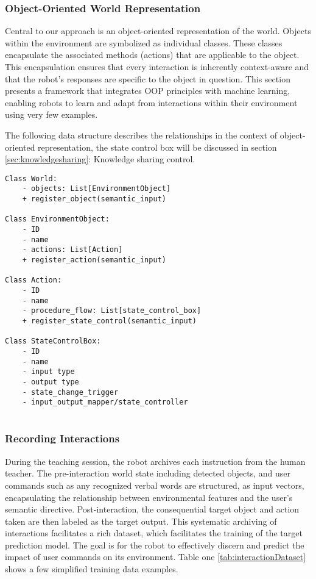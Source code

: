 \documentclass[conference]{IEEEtran}
\begin{document}
\subsubsection{Object-Oriented World Representation}

Central to our approach is an object-oriented representation of the world. Objects within the environment are symbolized as individual classes. These classes encapsulate the associated methods (actions) that are applicable to the object. This encapsulation ensures that every interaction is inherently context-aware and that the robot's responses are specific to the object in question. This section presents a framework that integrates OOP principles with machine learning, enabling robots to learn and adapt from interactions within their environment using very few examples.

The following data structure describes the relationships in the context of object-oriented representation, the state control box will be discussed in section \ref{sec:knowledgesharing}: Knowledge sharing control.

\begin{small}
\begin{verbatim}
Class World:
    - objects: List[EnvironmentObject]
    + register_object(semantic_input)

Class EnvironmentObject:
    - ID
    - name
    - actions: List[Action]
    + register_action(semantic_input)

Class Action:
    - ID
    - name
    - procedure_flow: List[state_control_box]
    + register_state_control(semantic_input)

Class StateControlBox:
    - ID
    - name
    - input type
    - output type
    - state_change_trigger
    - input_output_mapper/state_controller
    
\end{verbatim}
\end{small}

\subsubsection{Recording Interactions}

During the teaching session, the robot archives each instruction from the human teacher. The pre-interaction world state including detected objects, and user commands such as any recognized verbal words are structured, as input vectors, encapsulating the relationship between environmental features and the user's semantic directive. Post-interaction, the consequential target object and action taken are then labeled as the target output. This systematic archiving of interactions facilitates a rich dataset, which facilitates the training of the target prediction model. The goal is for the robot to effectively discern and predict the impact of user commands on its environment. Table one \ref{tab:interactionDataset} shows a few simplified training data examples.
\end{document}
